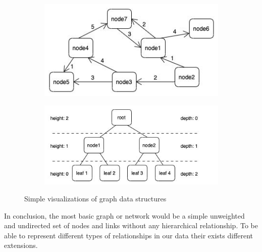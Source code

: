 \begin{figure}[h]
    \centering
    \begin{subfigure}[b]{0.45\columnwidth}
        \centering
        \includegraphics[width=\textwidth]{graphics/weightedDirectedNetwork.jpg}
        \label{fig:simple_weighted_directed_network}
    \end{subfigure}
    \begin{subfigure}[b]{0.54\columnwidth}
        \centering
        \includegraphics[width=\textwidth]{graphics/basicTree.jpg}
        \label{fig:simple_tree}
    \end{subfigure}
    
    \caption[Optional caption for the figure list (often used to abbreviate long captions)]{Simple visualizations of graph data structures} %
    \label{fig:intro} 
  \end{figure}

In conclusion, the most basic graph or network would be a simple unweighted and undirected set of nodes and links without any hierarchical relationship. To be able to represent different types of relationships in our data their exists different extensions. 

